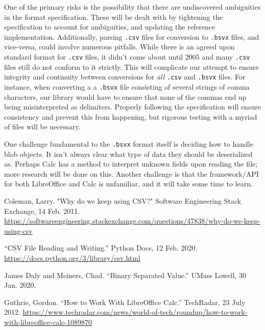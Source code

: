 \documentclass[10pt]{article}
\begin{document}
One of the primary risks is the possibility that there are undiscovered ambiguities in the format specification.
These will be dealt with by tightening the specification to account for ambiguities, and updating the reference implementation.
Additionally, parsing \texttt{.csv} files for conversion to \texttt{.bsvx} files, and vice-versa, could involve numerous pitfalls.
While there is an agreed upon standard format for \texttt{.csv} files, it didn’t come about until 2005 and many \texttt{.csv} files still do not conform to it strictly.
This will complicate our attempt to ensure integrity and continuity between conversions for \textit{all} \texttt{.csv} and \texttt{.bsvx} files.
For instance, when converting a a \texttt{.bsvx} file consisting of several strings of comma characters, our library would have to ensure that none of the commas end up being misinterpreted as delimiters.
Properly following the specification will ensure consistency and prevent this from happening, but rigorous testing with a myriad of files will be necessary.

\indent{}
One challenge fundamental to the \texttt{.bsvx} format itself is deciding how to handle blob objects.
It isn’t always clear what type of data they should be deserialized as.
Perhaps Calc has a method to interpret unknown fields upon reading the file; more research will be done on this.
Another challenge is that the framework/API for both LibreOffice and Calc is unfamiliar, and it will take some time to learn.

\clearpage
{}
\printnoidxglossary[nonumberlist]

\clearpage
\begin{thebibliography}{9}

    Coleman, Larry.
    "Why do we keep using CSV?"
    Software Engineering Stack Exchange,
    14 Feb. 2011.
    \url{https://softwareengineering.stackexchange.com/questions/47838/why-do-we-keep-using-csv}

    “CSV File Reading and Writing.”
    Python Docs,
    12 Feb. 2020.
    \url{https://docs.python.org/3/library/csv.html}

    James Daly and Meiners, Chad.
    “Binary Separated Value.”
    UMass Lowell,
    30 Jan. 2020.

    Guthrie, Gordon.
    “How to Work With LibreOffice Calc.”
    TechRadar,
    23 July 2012.
    \url{https://www.techradar.com/news/world-of-tech/roundup/how-to-work-with-libreoffice-calc-1089870}
  
\end{thebibliography}
\end{document}
